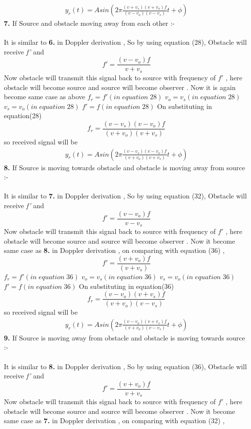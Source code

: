 \documentclass[journal,12pt,twocolumn]{IEEEtran}
\theoremstyle{remark}
\begin{document}
 \begin{align}y_r(t) = Asin( 2 \pi  \frac{(v+v_s)(v+v_o) f}{(v- v_o)(v-v_s) }t + \phi )\end{align}
 \textbf{7.} If Source and  obstacle moving away from each other :-\\\\
 It is similar to\textbf{ 6.} in Doppler derivation , So by using equation (28), Obstacle will receive \textit{f'} and 
 $$f' = \frac{(v-v_o) f}{v+v_s }$$
 Now obstacle will transmit this signal back to source with frequency of $f'$ , here obstacle will become source and source will become observer . Now it is again become same case as above
 $f_r=f'(in \;equation\; 28)$
 $v_o=v_s(in\; equation\; 28)$
  $v_s=v_o(in\; equation\; 28)$
 $f'=f(in\; equation \;28)$
 On substituting in equation(28)
 $$f_r = \frac{(v-v_s)(v-v_o) f}{(v+ v_o)(v+v_s) }$$
  so received signal will be
 \begin{align}y_r(t) = Asin( 2 \pi  \frac{(v-v_s)(v-v_o) f}{(v+ v_o)(v+v_s) }t + \phi )\end{align}
  \textbf{8.} If Source is moving towards obstacle and  obstacle is moving away from source :-\\\\
 It is similar to\textbf{ 7.} in Doppler derivation , So by using equation (32), Obstacle will receive \textit{f'} and 
 $$f' = \frac{(v-v_o) f}{v-v_s }$$
 Now obstacle will transmit this signal back to source with frequency of $f'$ , here obstacle will become source and source will become observer . Now it become same case as \textbf{8.} in Doppler derivation , on comparing with equation (36) ,
 $$f' = \frac{(v+v_o) f}{(v+v_s) }$$
 $f_r=f'(in \;equation\; 36)$
 $v_o=v_s(in\; equation\; 36)$
 $v_s=v_o(in\; equation\; 36)$
 $f'=f(in\; equation \;36)$
 On substituting in equation(36)
 $$f_r = \frac{(v-v_o)(v+v_s) f}{(v+ v_o)(v-v_s) }$$
  so received signal will be
 \begin{align}y_r(t) = Asin( 2 \pi  \frac{(v-v_o)(v+v_s) f}{(v+ v_o)(v-v_s) }t + \phi )\end{align}
  \textbf{9.} If Source is moving away from obstacle and  obstacle is moving towards source :-\\\\
 It is similar to\textbf{ 8.} in Doppler derivation , So by using equation (36), Obstacle will receive \textit{f'} and 
 $$f' = \frac{(v+v_o) f}{v+v_s }$$
 Now obstacle will transmit this signal back to source with frequency of $f'$ , here obstacle will become source and source will become observer . Now it become same case as \textbf{7.} in Doppler derivation , on comparing with equation (32) ,
\end{document}
